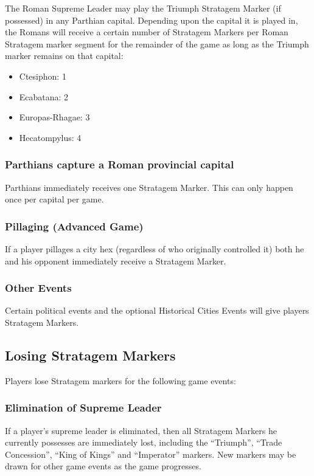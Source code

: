 The Roman Supreme Leader may play the Triumph Stratagem Marker (if possessed) in any Parthian capital. Depending upon the capital it is played in, the Romans will receive a certain number of Stratagem Markers per Roman Stratagem marker segment for the remainder of the game as long as the Triumph marker remains on that capital:

\begin{itemize}
  \item Ctesiphon: 1
  \item Ecabatana: 2
  \item Europas-Rhagae: 3
  \item Hecatompylus: 4
\end{itemize}

\subsubsection{Parthians capture a Roman provincial capital}

Parthians immediately receives one Stratagem Marker. This can only happen once per capital per game.

\subsubsection{Pillaging (Advanced Game)}

If a player pillages a city hex (regardless of who originally controlled it) both he and his opponent immediately receive a Stratagem Marker.

\subsubsection{Other Events}

Certain political events and the optional Historical Cities Events will give players Stratagem Markers.

\subsection{Losing Stratagem Markers}

Players lose Stratagem markers for the following game events:

\subsubsection{Elimination of Supreme Leader}

If a player's supreme leader is eliminated, then all Stratagem Markers he currently possesses are immediately lost, including the “Triumph”, “Trade Concession”, “King of Kings” and “Imperator” markers. New markers may be drawn for other game events as the game progresses.

